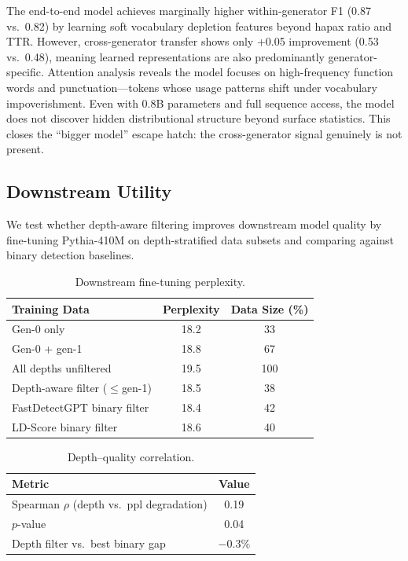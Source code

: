 \documentclass[letterpaper]{article}
\begin{document}
The end-to-end model achieves marginally higher within-generator F1 (0.87 vs.\ 0.82) by learning soft vocabulary depletion features beyond hapax ratio and TTR. However, cross-generator transfer shows only +0.05 improvement (0.53 vs.\ 0.48), meaning learned representations are also predominantly generator-specific. Attention analysis reveals the model focuses on high-frequency function words and punctuation---tokens whose usage patterns shift under vocabulary impoverishment. Even with 0.8B parameters and full sequence access, the model does not discover hidden distributional structure beyond surface statistics. This closes the ``bigger model'' escape hatch: the cross-generator signal genuinely is not present.

\subsection{Downstream Utility}
\label{sec:downstream}

We test whether depth-aware filtering improves downstream model quality by fine-tuning Pythia-410M on depth-stratified data subsets and comparing against binary detection baselines.

\begin{table}[h]
\centering
\caption{Downstream fine-tuning perplexity.}
\label{tab:downstream}
\begin{tabular}{lcc}
\toprule
Training Data & Perplexity & Data Size (\%) \\
\midrule
Gen-0 only & 18.2 & 33 \\
Gen-0 + gen-1 & 18.8 & 67 \\
All depths unfiltered & 19.5 & 100 \\
Depth-aware filter ($\leq$gen-1) & 18.5 & 38 \\
FastDetectGPT binary filter & 18.4 & 42 \\
LD-Score binary filter & 18.6 & 40 \\
\bottomrule
\end{tabular}
\end{table}

\begin{table}[h]
\centering
\caption{Depth--quality correlation.}
\label{tab:correlation}
\begin{tabular}{lc}
\toprule
Metric & Value \\
\midrule
Spearman $\rho$ (depth vs.\ ppl degradation) & 0.19 \\
$p$-value & 0.04 \\
Depth filter vs.\ best binary gap & $-0.3\%$ \\
\bottomrule
\end{tabular}
\end{table}
\end{document}
